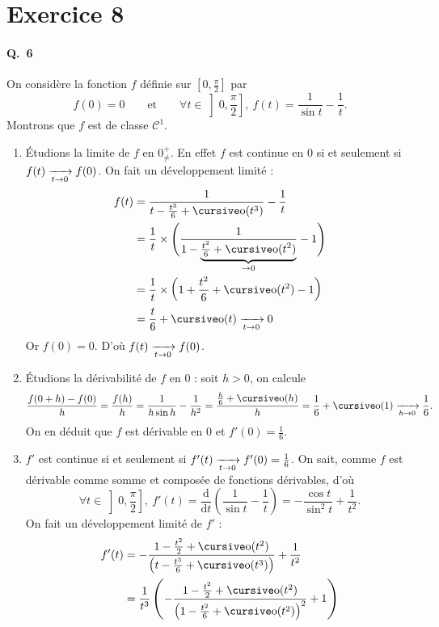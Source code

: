 \section{Exercice 8}

\paragraph{Q.\ 6}
On considère la fonction $f$\/ définie sur $\left[ 0,\frac{\pi}{2} \right]$\/ par \[
	f(0) = 0 \qquad\text{et}\qquad\forall t \in \left] 0,\frac{\pi}{2} \right],\:f(t) = \frac{1}{\sin t} - \frac{1}{t}
.\]
Montrons que $f$\/ est de classe $\mathscr{C}^1$.

\begin{enumerate}
	\item Étudions la limite de $f$\/ en $0^+_{\neq}$. En effet $f$\/ est continue en 0 si et seulement si $f(t) \xrightarrow[t\to 0]{} f(0)$. On fait un développement limité :
		\begin{align*}
			f(t) &= \frac{1}{t - \frac{t^3}{6} + \po(t^3)} - \frac{1}{t}\\
			&= \frac{1}{t} \times \Bigg( \frac{1}{1-\underbrace{\tfrac{t^2}{6} + \po(t^2)}_{\to 0}} - 1 \Bigg) \\
			&= \frac{1}{t} \times \left( 1 + \frac{t^2}{6} + \po(t^2) - 1 \right)  \\
			&= \frac{t}{6} + \po(t) \tendsto{t\to 0} 0 \\
		\end{align*}
		Or $f(0) = 0$. D'où $f(t) \xrightarrow[t\to 0]{} f(0)$.
	\item Étudions la dérivabilité de $f$\/ en 0 : soit $h > 0$, on calcule \[
			\frac{f(0+h) -f(0)}{h} = \frac{f(h)}{h} = \frac{1}{h\sin h} - \frac{1}{h^2} = \frac{\frac{h}{6} + \po(h)}{h} = \frac{1}{6} + \po(1) \tendsto{h\to 0} \frac{1}{6}
		.\]
		On en déduit que $f$\/ est dérivable en 0 et $f'(0) = \frac{1}{6}$.
	\item $f'$\/ est continue si et seulement si $f'(t) \xrightarrow[t\to 0]{} f'(0) = \frac{1}{6}$. On sait, comme $f$\/ est dérivable comme somme et composée de fonctions dérivables, d'où \[
		\forall t \in \left] 0, \frac{\pi}{2} \right],\:f'(t) = \frac{\mathrm{d}}{\mathrm{d}t} \left( \frac{1}{\sin t} - \frac{1}{t} \right) = - \frac{\cos t}{\sin^2 t} + \frac{1}{t^2}
	.\]
	On fait un développement limité de $f'$\/ :
	\begin{align*}
		f'(t) &= -\frac{1 - \frac{t^2}{2} + \po(t^2)}{\left( t - \frac{t^3}{6} + \po(t^3) \right)} + \frac{1}{t^2}\\
		&= \frac{1}{t^3} \left( - \frac{1-\frac{t^2}{2} + \po(t^2)}{\left(1 - \frac{t^2}{6} + \po(t^2)\right)^2} + 1 \right) \\

\end{align*}
\end{enumerate}
